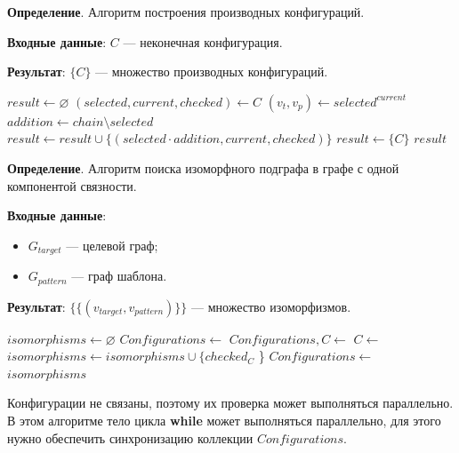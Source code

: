\textbf{Определение}. Алгоритм  построения производных конфигураций.

\textbf{Входные данные}: $C$ --- неконечная конфигурация.

\textbf{Результат}: $\{ C \}$ --- множество производных конфигураций.

\begin{algorithmic}
\State $result \gets \varnothing$
\State $(selected, current, checked) \gets C$
\State $(v_t, v_p) \gets selected^{current}$
    \State $addition \gets chain \setminus selected$
        \State $result \gets result \cup \{ (selected \cdot addition, current, checked) \}$
    \EndIf
\EndFor
{}
    \State $result \gets \{ C \}$
\EndIf
\State \Return $result$
\EndFunction
\end{algorithmic}

\textbf{Определение}. Алгоритм поиска изоморфного подграфа в графе с одной
компонентой связности.

\textbf{Входные данные}:
\begin{itemize}
\item $G_{target}$ --- целевой граф;
\item $G_{pattern}$ --- граф шаблона.
\end{itemize}

\textbf{Результат}: $\{ \{ ( v_{target}, v_{pattern} ) \} \}$ --- множество
изоморфизмов.

\begin{algorithmic}
    \State $isomorphisms \gets \varnothing$
    \State $Configurations \gets$ 
        \State $Configurations, C \gets$ 
        \State $C \gets$ 
                \State $isomorphisms \gets isomorphisms \cup \{ checked_C$ \}
            \EndIf
        \Else
            \State $Configurations \gets$ 
        \EndIf
    \EndWhile
    \State \Return $isomorphisms$
\EndFunction
\end{algorithmic}

Конфигурации не связаны, поэтому их проверка может выполняться параллельно.
В этом алгоритме тело цикла \textbf{while} может выполняться параллельно,
для этого нужно обеспечить синхронизацию коллекции $Configurations$.

